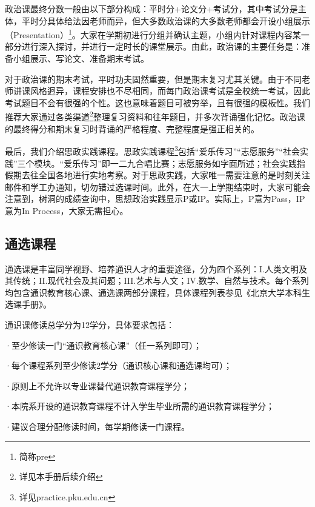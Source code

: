 \documentclass[11pt,oneside]{book}
\begin{document}
政治课最终分数一般由以下部分构成：平时分+论文分+考试分，其中考试分是主体，平时分具体给法因老师而异，但大多数政治课的大多数老师都会开设小组展示（Presentation）\footnote{简称pre}。大家在学期初进行分组并确认主题，小组内针对课程内容某一部分进行深入探讨，并进行一定时长的课堂展示。由此，政治课的主要任务是：准备小组展示、写论文、准备期末考试。

\vspace{10pt}

对于政治课的期末考试，平时功夫固然重要，但是期末复习尤其关键。由于不同老师讲课风格迥异，课程安排也不尽相同，而每门政治课考试是全校统一考试，因此考试题目不会有很强的个性。这也意味着题目可被穷举，且有很强的模板性。我们推荐大家通过各类渠道\footnote{详见本手册后续介绍}整理复习资料和往年题目，并多次背诵强化记忆。政治课的最终得分和期末复习时背诵的严格程度、完整程度是强正相关的。

\vspace{10pt}

最后，我们介绍思政实践课程。思政实践课程\footnote{详见practice.pku.edu.cn}包括“爱乐传习”“志愿服务”“社会实践”三个模块。“爱乐传习”即一二九合唱比赛；志愿服务如字面所述；社会实践指假期去往全国各地进行实地考察。对于思政实践，大家唯一需要注意的是时刻关注邮件和学工办通知，切勿错过选课时间。此外，在大一上学期结束时，大家可能会注意到，树洞的成绩查询中，思想政治实践显示P或IP。实际上，P意为Pass，IP意为In Process，大家无需担心。

\subsection{通选课程}
通选课是丰富同学视野、培养通识人才的重要途径，分为四个系列：I.人类文明及其传统；II.现代社会及其问题；III.艺术与人文；IV.数学、自然与技术。每个系列均包含通识教育核心课、通选课两部分课程，具体课程列表参见《北京大学本科生选课手册》。

\vspace{10pt}

通识课修读总学分为12学分，具体要求包括：

·至少修读一门“通识教育核心课”（任一系列即可）；

·每个课程系列至少修读2学分（通识核心课和通选课均可）；

·原则上不允许以专业课替代通识教育课程学分；

·本院系开设的通识教育课程不计入学生毕业所需的通识教育课程学分；

·建议合理分配修读时间，每学期修读一门课程。

\vspace{10pt}
\end{document}
